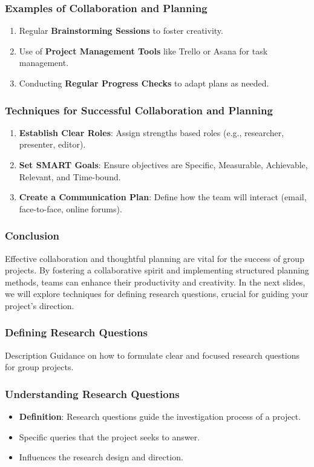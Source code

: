 \documentclass[aspectratio=169]{beamer}
\begin{document}
\begin{frame}[fragile]
    \frametitle{Examples of Collaboration and Planning}
    \begin{enumerate}
        \item Regular \textbf{Brainstorming Sessions} to foster creativity.
        \item Use of \textbf{Project Management Tools} like Trello or Asana for task management.
        \item Conducting \textbf{Regular Progress Checks} to adapt plans as needed.
    \end{enumerate}
\end{frame}

\begin{frame}[fragile]
    \frametitle{Techniques for Successful Collaboration and Planning}
    \begin{enumerate}
        \item \textbf{Establish Clear Roles}: Assign strengths based roles (e.g., researcher, presenter, editor).
        \item \textbf{Set SMART Goals}: Ensure objectives are Specific, Measurable, Achievable, Relevant, and Time-bound.
        \item \textbf{Create a Communication Plan}: Define how the team will interact (email, face-to-face, online forums).
    \end{enumerate}
\end{frame}

\begin{frame}[fragile]
    \frametitle{Conclusion}
    Effective collaboration and thoughtful planning are vital for the success of group projects. By fostering a collaborative spirit and implementing structured planning methods, teams can enhance their productivity and creativity. In the next slides, we will explore techniques for defining research questions, crucial for guiding your project's direction.
\end{frame}

\begin{frame}[fragile]
    \frametitle{Defining Research Questions}
    \begin{block}{Description}
        Guidance on how to formulate clear and focused research questions for group projects.
    \end{block}
\end{frame}

\begin{frame}[fragile]
    \frametitle{Understanding Research Questions}
    \begin{itemize}
        \item \textbf{Definition}: Research questions guide the investigation process of a project.
        \item Specific queries that the project seeks to answer.
        \item Influences the research design and direction.
    \end{itemize}
\end{frame}
\end{document}
